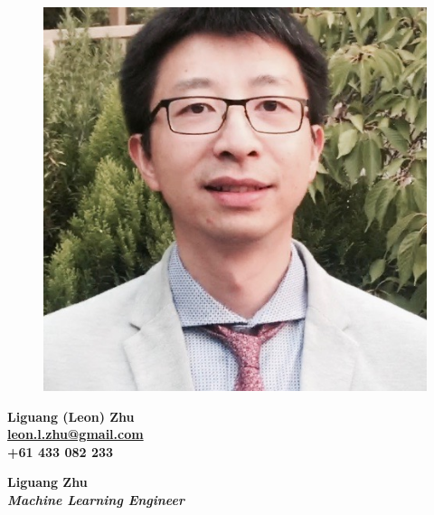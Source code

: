 \documentclass[a4paper,8pt,final]{memoir}
\newcommand{\Sep}{\vspace{1.5em}}
\newcommand{\SmallSep}{\vspace{0.5em}}
\newenvironment{Highlights}
	{\ignorespaces\textbf{\color{RoyalBlue} Highlights}}
	{\Sep\ignorespacesafterend}
\newcommand{\CVSection}[1]
	{\Large\textbf{#1}\par
	\SmallSep\normalsize\normalfont}
\newcommand{\CVItem}[1]
	{\textbf{\color{RoyalBlue} #1}}
\begin{document}
\begin{figure}
	\hfill
	\includegraphics[width=0.6\columnwidth]{me}
	\vspace{-7cm}
\end{figure}

\begin{flushright}\small
\textbf{
	Liguang (Leon) Zhu \\
	\url{leon.l.zhu@gmail.com}  \\
	+61 433 082 233}
\end{flushright}\normalsize
%

\framebreak


\Huge\bfseries {\color{RoyalBlue} Liguang Zhu} \\
\Large\bfseries {\em Machine Learning Engineer} \\

\normalsize\normalfont

\end{document}

